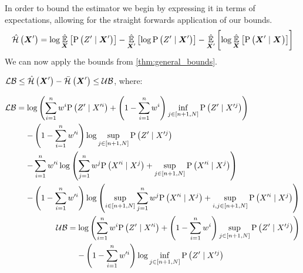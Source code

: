 In order to bound the estimator we begin by expressing it in terms of expectations, allowing for the straight forwards application of our bounds.
\begin{equation}
		\entropyEstimator{\statesRV{}^\prime}=\log\estimator{\probcond{\observations{}^\prime}{\statesRV{}^\prime}}{\statesRV{}}-\estimator{\log\probcond{\observations{}^\prime}{\statesRV{}^\prime}}{\statesRV{}^\prime}-\estimator{\log\estimator{\probcond{\statesRV{}^\prime}{\statesRV{}}}{\statesRV{}}}{\statesRV{}^\prime}
\end{equation}
We can now apply the bounds from \cref{thm:general_bounds}.
\begin{lemmaE}
	\label{thm:boers_bounds}
	$\operatorname*{\mathcal{LB}}\leq\hat{\mathcal{H}}\left({\boldsymbol X_{}^\prime}\right)-\bar{\mathcal{H}}_{}\left({\boldsymbol X_{}^\prime}\right)\leq\operatorname*{\mathcal{UB}}$, where:
	\begin{small}
	\begin{subequations}
		\begin{align}
			\begin{split}
				\lowerbound &=\log\left(\sum\limits_{i=1}^n\weight{}{i}\probcond{\observations{}^\prime}{\states{}^{\prime i}}+\left(1-\sum\limits_{i=1}^n\weight{}{i}\right)\inf\limits_{j\in[n+1,N]}\probcond{\observations{}^\prime}{\states{}^{\prime j}}\right) \\
				& \phantomeq-\left(1-\sum_{i=1}^n\weight{}{\prime i}\right)\log\sup_{j\in[n+1,N]}\probcond{\observations{}^\prime}{\states{}^{\prime j}}\\
				&\phantomeq-\sum_{i=1}^n\weight{}{\prime i}\log\left(\sum_{j=1}^n\weight{}{j}\probcond{\states{}^{\prime i}}{\states{}^j}+\sup_{j\in[n+1,N]}\probcond{\states{}^{\prime i}}{\states{}^j}\right)\\
				& \phantomeq-\left(1-\sum_{i=1}^n\weight{}{\prime i}\right)\log\left(\sup_{i\in[n+1,N]}\sum_{j=1}^n\weight{}{j}\probcond{\states{}^{\prime i}}{\states{}^j}+\sup_{i,j\in[n+1,N]}\probcond{\states{}^{\prime i}}{\states{}^j}\right)
			\end{split} \\
			\begin{split}
				\upperbound & =\log\left(\sum\limits_{i=1}^n\weight{}{i}\probcond{\observations{}^\prime}{\states{}^{\prime i}}+\left(1-\sum\limits_{i=1}^n\weight{}{i}\right)\sup\limits_{j\in[n+1,N]}\probcond{\observations{}^\prime}{\states{}^{\prime j}}\right) \\
				& \phantomeq-\left(1-\sum_{i=1}^n\weight{}{\prime i}\right)\log\inf_{j\in[n+1,N]}\probcond{\observations{}^\prime}{\states{}^{\prime j}}\\

\end{split}
\end{align}
\end{subequations}
\end{small}
\end{lemmaE}
